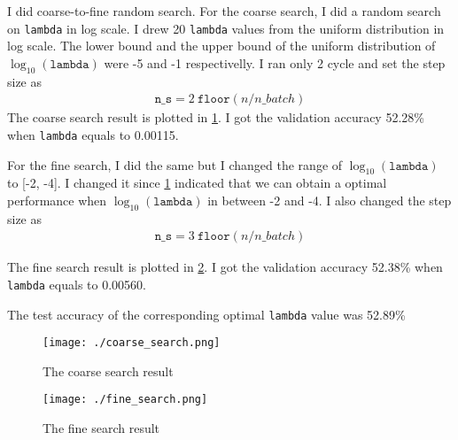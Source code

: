 \documentclass[12pt]{article}
\newenvironment{question}[2][Question]{\begin{trivlist}
\kern10pt
\item[\hskip \labelsep {\bfseries #1}\hskip \labelsep {\bfseries #2.}]}{\end{trivlist}}
\begin{document}
\begin{question}{iv}
    I did coarse-to-fine random search.
    For the coarse search, I did a random search on \texttt{lambda} in log scale.
    I drew 20 \texttt{lambda} values from the uniform distribution in log scale.
    The lower bound and the upper bound of the uniform distribution of $\log_{10}(\texttt{lambda})$
    were -5 and -1 respectivelly. I ran only 2 cycle and set the step size as
    \begin{align*}
        \texttt{n\_s} = 2 ~ \texttt{floor}(n / n\_batch)
    \end{align*}
    The coarse search result is plotted in \cref{plt:coarse_search}.
    I got the validation accuracy 52.28\% when \texttt{lambda} equals to 0.00115.

    For the fine search, I did the same but I changed the range of
    $\log_{10}(\texttt{lambda})$ to [-2, -4]. I changed it since
    \cref{plt:coarse_search} indicated that we can obtain a optimal performance
    when $\log_{10}(\texttt{lambda})$ in between -2 and -4.
    I also changed the step size as
    \begin{align*}
        \texttt{n\_s} = 3 ~ \texttt{floor}(n / n\_batch)
    \end{align*}

    The fine search result is plotted in \cref{plt:fine_search}.
    I got the validation accuracy 52.38\% when \texttt{lambda} equals to 0.00560.

    The test accuracy of the corresponding optimal \texttt{lambda} value was 52.89\%

    \begin{figure}[h]
        \centering
        \texttt{[image: ./coarse\_search.png]}
        \caption{The coarse search result}
        \label{plt:coarse_search}
    \end{figure}

    \begin{figure}[h]
        \centering
        \texttt{[image: ./fine\_search.png]}
        \caption{The fine search result}
        \label{plt:fine_search}
    \end{figure}
\end{question}
\end{document}
